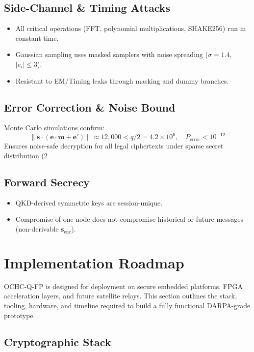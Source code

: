 \documentclass[12pt]{article}
\begin{document}
\subsection*{Side-Channel \& Timing Attacks}

\begin{itemize}
    \item All critical operations (FFT, polynomial multiplications, SHAKE256) run in constant time.
    \item Gaussian sampling uses masked samplers with noise spreading (\( \sigma = 1.4 \), \( |e_i| \leq 3 \)).
    \item Resistant to EM/Timing leaks through masking and dummy branches.
\end{itemize}

\subsection*{Error Correction \& Noise Bound}

Monte Carlo simulations confirm:
\[
\|\mathbf{s} \cdot (\mathbf{e} \cdot \mathbf{m} + \mathbf{e}')\| \approx 12,000 < q/2 = 4.2 \times 10^6, \quad P_{\text{error}} < 10^{-12}
\]
Ensures noise-safe decryption for all legal ciphertexts under sparse secret distribution (2%

\subsection*{Forward Secrecy}

\begin{itemize}
    \item QKD-derived symmetric keys are session-unique.
    \item Compromise of one node does not compromise historical or future messages (non-derivable \( \mathbf{s}_{\text{enc}} \)).
\end{itemize}
\section*{Implementation Roadmap}

OCHC-Q-FP is designed for deployment on secure embedded platforms, FPGA acceleration layers, and future satellite relays. This section outlines the stack, tooling, hardware, and timeline required to build a fully functional DARPA-grade prototype.

\subsection*{Cryptographic Stack}
\end{document}
